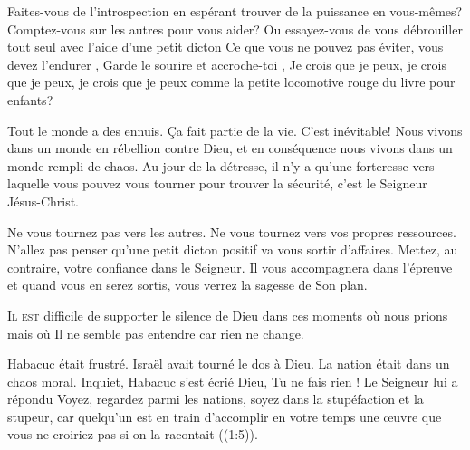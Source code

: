 Faites-vous de l'introspection en espérant trouver de la puissance
 en vous-mêmes? Comptez-vous sur les autres pour vous aider?
 Ou essayez-vous de vous débrouiller tout seul avec l'aide d'une petit dicton\frcolon{}
 \Og Ce que vous ne pouvez pas éviter, vous devez l'endurer \Fg{},
 \Og Garde le sourire et accroche-toi \Fg{},
 \Og Je crois que je peux, je crois que je peux, je crois que je peux \Fg{}
 comme la petite locomotive rouge du livre pour enfants? 

Tout le monde a des ennuis. Ça fait partie de la vie. C'est inévitable!
 Nous vivons dans un monde en rébellion contre Dieu, et en conséquence
 nous vivons dans un monde rempli de chaos. Au jour de la détresse,
 il n'y a qu'une forteresse vers laquelle vous pouvez vous tourner
 pour trouver la sécurité, c'est le Seigneur Jésus-Christ. 

Ne vous tournez pas vers les autres. Ne vous tournez vers vos propres
 ressources. N'allez pas penser qu'une petit dicton positif va vous sortir
 d'affaires. Mettez, au contraire, votre confiance dans le Seigneur.
 Il vous accompagnera dans l'épreuve et quand vous en serez sortis,
 vous verrez la sagesse de Son plan. 

\dvrule






\lettrine{I}{l est} difficile de supporter le silence de Dieu
 \ocadr dans ces moments où nous prions mais où Il ne semble pas
 entendre car rien ne change. 

Habacuc était frustré. Israël avait tourné le dos à Dieu.
 La nation était dans un chaos moral. Inquiet, Habacuc s'est écrié\frcolon{} 
 \Og Dieu, Tu ne fais rien ! \Fg{} 
 Le Seigneur lui a répondu\frcolon{} \Og Voyez, regardez parmi les nations,
 soyez dans la stupéfaction et la stupeur, car quelqu'un est en train
 d'accomplir en votre temps une \oe{}uvre que vous ne croiriez pas
 si on la racontait \Fg{} ((1:5)).

